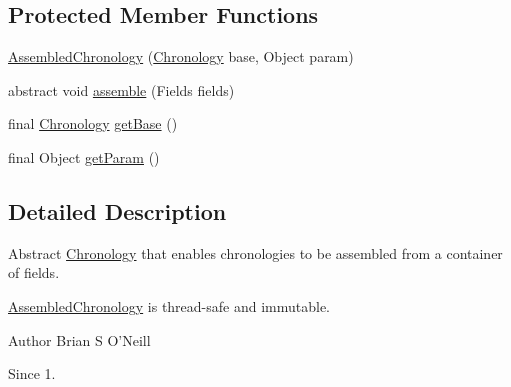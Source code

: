 \subsection*{Protected Member Functions}
\begin{DoxyCompactItemize}
\item 
\hyperlink{classorg_1_1joda_1_1time_1_1chrono_1_1_assembled_chronology_a1fd1ac006d5db92a15e0b439c71eadc2}{Assembled\-Chronology} (\hyperlink{classorg_1_1joda_1_1time_1_1_chronology}{Chronology} base, Object param)
\item 
abstract void \hyperlink{classorg_1_1joda_1_1time_1_1chrono_1_1_assembled_chronology_a28011ddeb628fa98ee4ccc61be85094f}{assemble} (Fields fields)
\item 
final \hyperlink{classorg_1_1joda_1_1time_1_1_chronology}{Chronology} \hyperlink{classorg_1_1joda_1_1time_1_1chrono_1_1_assembled_chronology_aece8e50281c43b67a6f4816500a5d108}{get\-Base} ()
\item 
final Object \hyperlink{classorg_1_1joda_1_1time_1_1chrono_1_1_assembled_chronology_a0537b9b802473706875ba27748dc2a12}{get\-Param} ()
\end{DoxyCompactItemize}


\subsection{Detailed Description}
Abstract \hyperlink{classorg_1_1joda_1_1time_1_1_chronology}{Chronology} that enables chronologies to be assembled from a container of fields. 

\hyperlink{classorg_1_1joda_1_1time_1_1chrono_1_1_assembled_chronology}{Assembled\-Chronology} is thread-\/safe and immutable.

\begin{DoxyAuthor}{Author}
Brian S O'Neill 
\end{DoxyAuthor}
\begin{DoxySince}{Since}
1. 
\end{DoxySince}


